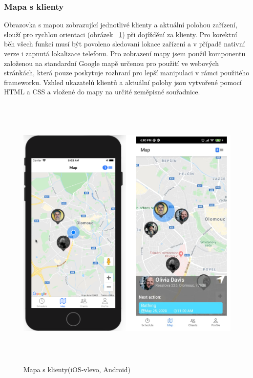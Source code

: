 \documentclass[
  biblatex,
  glossaries,
  index
]{kidiplom}
\begin{document}
\subsubsection{Mapa s klienty}
Obrazovka s mapou zobrazující jednotlivé klienty a aktuální polohou zařízení, slouží pro rychlou orientaci (obrázek ~\ref{fig:mapClients}) při dojíždění za klienty. Pro korektní běh všech funkcí musí být povoleno sledovaní lokace zařízení a v případě nativní verze i zapnutá lokalizace telefonu. Pro zobrazení mapy jsem použil komponentu založenou na standardní Google mapě určenou pro použití ve webových stránkách, která pouze poskytuje rozhraní pro lepší manipulaci v rámci použitého frameworku. Vzhled ukazatelů klientů a aktuální polohy jsou vytvořené pomocí HTML a CSS a vložené do mapy na určité zeměpisné souřadnice.

\begin{figure}[H]
  	\centering
 	 \includegraphics[width=14cm,height=14cm,keepaspectratio]{map}
 	 \caption{Mapa s klienty(iOS-vlevo, Android)}
 	 \label{fig:mapClients}
\end{figure}
\end{document}
